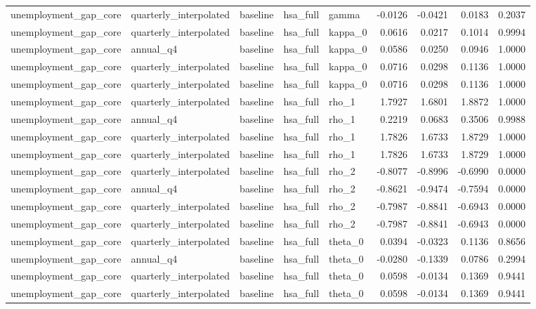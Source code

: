 \begin{tabular}{lllllrrrr}
unemployment\_gap\_core & quarterly\_interpolated & baseline & hsa\_full & gamma & -0.0126 & -0.0421 & 0.0183 & 0.2037 \\
unemployment\_gap\_core & quarterly\_interpolated & baseline & hsa\_full & kappa\_0 & 0.0616 & 0.0217 & 0.1014 & 0.9994 \\
unemployment\_gap\_core & annual\_q4 & baseline & hsa\_full & kappa\_0 & 0.0586 & 0.0250 & 0.0946 & 1.0000 \\
unemployment\_gap\_core & quarterly\_interpolated & baseline & hsa\_full & kappa\_0 & 0.0716 & 0.0298 & 0.1136 & 1.0000 \\
unemployment\_gap\_core & quarterly\_interpolated & baseline & hsa\_full & kappa\_0 & 0.0716 & 0.0298 & 0.1136 & 1.0000 \\
unemployment\_gap\_core & quarterly\_interpolated & baseline & hsa\_full & rho\_1 & 1.7927 & 1.6801 & 1.8872 & 1.0000 \\
unemployment\_gap\_core & annual\_q4 & baseline & hsa\_full & rho\_1 & 0.2219 & 0.0683 & 0.3506 & 0.9988 \\
unemployment\_gap\_core & quarterly\_interpolated & baseline & hsa\_full & rho\_1 & 1.7826 & 1.6733 & 1.8729 & 1.0000 \\
unemployment\_gap\_core & quarterly\_interpolated & baseline & hsa\_full & rho\_1 & 1.7826 & 1.6733 & 1.8729 & 1.0000 \\
unemployment\_gap\_core & quarterly\_interpolated & baseline & hsa\_full & rho\_2 & -0.8077 & -0.8996 & -0.6990 & 0.0000 \\
unemployment\_gap\_core & annual\_q4 & baseline & hsa\_full & rho\_2 & -0.8621 & -0.9474 & -0.7594 & 0.0000 \\
unemployment\_gap\_core & quarterly\_interpolated & baseline & hsa\_full & rho\_2 & -0.7987 & -0.8841 & -0.6943 & 0.0000 \\
unemployment\_gap\_core & quarterly\_interpolated & baseline & hsa\_full & rho\_2 & -0.7987 & -0.8841 & -0.6943 & 0.0000 \\
unemployment\_gap\_core & quarterly\_interpolated & baseline & hsa\_full & theta\_0 & 0.0394 & -0.0323 & 0.1136 & 0.8656 \\
unemployment\_gap\_core & annual\_q4 & baseline & hsa\_full & theta\_0 & -0.0280 & -0.1339 & 0.0786 & 0.2994 \\
unemployment\_gap\_core & quarterly\_interpolated & baseline & hsa\_full & theta\_0 & 0.0598 & -0.0134 & 0.1369 & 0.9441 \\
unemployment\_gap\_core & quarterly\_interpolated & baseline & hsa\_full & theta\_0 & 0.0598 & -0.0134 & 0.1369 & 0.9441 \\

\end{tabular}
